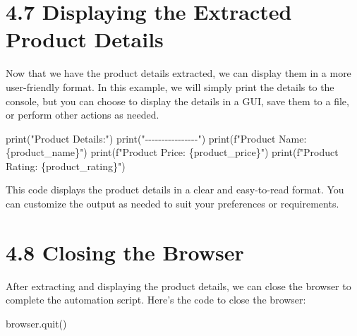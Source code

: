 \documentclass[
  paper=a4,
  ,captions=tableheading
]{scrartcl}
\newenvironment{Shaded}{}{}
\newcommand{\BuiltInTok}[1]{\textcolor[rgb]{0.00,0.50,0.00}{#1}}
\newcommand{\NormalTok}[1]{#1}
\newcommand{\SpecialCharTok}[1]{\textcolor[rgb]{0.25,0.44,0.63}{#1}}
\newcommand{\SpecialStringTok}[1]{\textcolor[rgb]{0.73,0.40,0.53}{#1}}
\newcommand{\StringTok}[1]{\textcolor[rgb]{0.25,0.44,0.63}{#1}}
\begin{document}
\hypertarget{displaying-the-extracted-product-details}{%
\section{4.7 Displaying the Extracted Product
Details}\label{displaying-the-extracted-product-details}}

Now that we have the product details extracted, we can display them in a
more user-friendly format. In this example, we will simply print the
details to the console, but you can choose to display the details in a
GUI, save them to a file, or perform other actions as needed.

\begin{Shaded}
\begin{Highlighting}[]
\BuiltInTok{print}\NormalTok{(}\StringTok{"Product Details:"}\NormalTok{)}
\BuiltInTok{print}\NormalTok{(}\StringTok{"{-}{-}{-}{-}{-}{-}{-}{-}{-}{-}{-}{-}{-}{-}{-}{-}"}\NormalTok{)}
\BuiltInTok{print}\NormalTok{(}\SpecialStringTok{f"Product Name: }\SpecialCharTok{\{}\NormalTok{product\_name}\SpecialCharTok{\}}\SpecialStringTok{"}\NormalTok{)}
\BuiltInTok{print}\NormalTok{(}\SpecialStringTok{f"Product Price: }\SpecialCharTok{\{}\NormalTok{product\_price}\SpecialCharTok{\}}\SpecialStringTok{"}\NormalTok{)}
\BuiltInTok{print}\NormalTok{(}\SpecialStringTok{f"Product Rating: }\SpecialCharTok{\{}\NormalTok{product\_rating}\SpecialCharTok{\}}\SpecialStringTok{"}\NormalTok{)}
\end{Highlighting}
\end{Shaded}

This code displays the product details in a clear and easy-to-read
format. You can customize the output as needed to suit your preferences
or requirements.

\hypertarget{closing-the-browser}{%
\section{4.8 Closing the Browser}\label{closing-the-browser}}

After extracting and displaying the product details, we can close the
browser to complete the automation script. Here's the code to close the
browser:

\begin{Shaded}
\begin{Highlighting}[]
\NormalTok{browser.quit()}
\end{Highlighting}
\end{Shaded}
\end{document}
